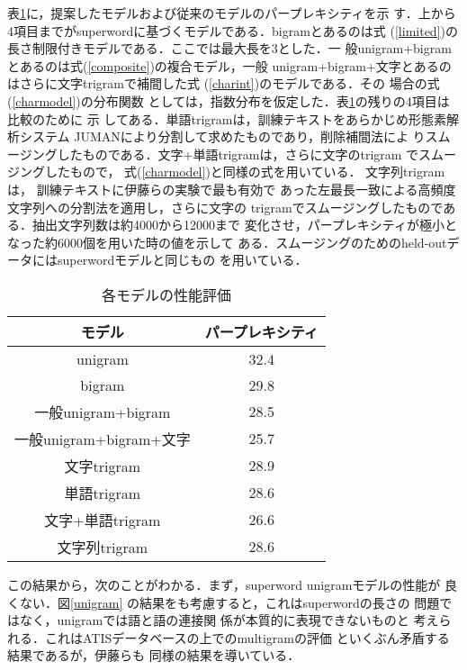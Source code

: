 表\ref{tab2}に，提案したモデルおよび従来のモデルのパープレキシティを示
す．上から4項目までがsuperwordに基づくモデルである．bigramとあるのは式
(\ref{limited})の長さ制限付きモデルである．ここでは最大長を3とした．一
般unigram+bigramとあるのは式(\ref{composite})の複合モデル，一般
unigram+bigram+文字とあるのはさらに文字trigramで補間した式
(\ref{charint})のモデルである．その\break
場合の式(\ref{charmodel})の分布関数
としては，指数分布を仮定した．表\ref{tab2}の残りの4項目は比較のために
示\break
してある．単語trigramは，訓練テキストをあらかじめ形態素解析システム
JUMAN\cite{juman94}により分割して求めたものであり，削除補間法によ
りスムージングしたものである．文字+単語trigramは，さらに文字のtrigram
でスムージングしたもので，\break
式\hspace{-0.1mm}(\ref{charmodel})\hspace{-0.1mm}と同様の式を用いている．
文字列\hspace{-0.1mm}trigram\hspace{-0.1mm}は，
訓練テキストに伊藤らの実験\hspace{-0.1mm}\cite{aito96}で最も有効で
あった左最長一致による高頻度文字列への分割法を適用し，さらに文字の\break
trigramでスムージングしたものである．抽出文字列数は約4000から12000まで
変化させ，パープレキシティが極小となった約6000個を用いた時の値を示して
ある．スムージングのためのheld-outデータにはsuperwordモデルと同じもの
を用いている．
\begin{table}[t]
\begin{center}
\caption{各モデルの性能評価}
\label{tab2}
\begin{tabular}{|c|c|} \hline
モデル & パープレキシティ \\ \hline
unigram & 32.4 \\
bigram & 29.8 \\
一般unigram+bigram & 28.5 \\
一般unigram+bigram+文字 & 25.7 \\ \hline
文字trigram & 28.9 \\
単語trigram & 28.6 \\
文字+単語trigram & 26.6 \\
文字列trigram & 28.6 \\ \hline
\end{tabular}
\end{center}
\end{table}

この結果から，次のことがわかる．まず，superword unigramモデルの性能が
良くない．図\ref{unigram}\break
の結果をも考慮すると，これはsuperwordの長さの
問題ではなく，unigramでは語と語の連接関\break
係が本質的に表現できないものと
考えられる．これはATISデータベースの上でのmultigramの評価\cite{deligne95}
といくぶん矛盾する結果であるが，伊藤ら\cite{aito96}も
同様の結果を導いている．

